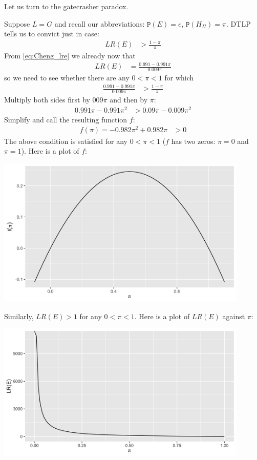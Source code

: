 \documentclass{ifcolog}
\newcommand{\pr}[1]{\mbox{$\mathtt{P}(#1)$}}
\begin{document}
Let us turn to the gatecrasher paradox. 


 Suppose $L=G$ and recall our abbreviations: $\pr{E}=e$, $\pr{H_\Pi}=\pi$. DTLP tells us to convict just in case:
 \begin{align*}
 LR(E) &> \frac{1-\pi}{\pi}
 \end{align*}
 \noindent From \eqref{eq:Cheng_lre} we already now that 
 \begin{align*}
 LR(E) & = \frac{0.991-0.991\pi}{0.009\pi}
 \end{align*}
 \noindent so we need to see whether there are any $0<\pi<1$ for which  
 \begin{align*}
  \frac{0.991-0.991\pi}{0.009\pi} &> \frac{1-\pi}{\pi}
 \end{align*}
 \noindent Multiply both sides first by $009\pi$ and then by $\pi$:
 \begin{align*}
 0.991\pi - 0.991\pi^2 &> 0.09\pi - 0.009\pi^2
 \end{align*}
 \noindent Simplify and call the resulting function $f$:
 \begin{align*}
 f(\pi) = - 0.982 \pi^2 + 0.982\pi &>0 
 \end{align*}
 \noindent The above condition is satisfied for any $0<\pi <1$ ($f$ has two zeros: $\pi = 0$ and $\pi = 1$). Here is  a plot of $f$:

 \includegraphics[width=12cm]{f-gate.png}

 Similarly, $LR(E)>1$ for any $0< \pi <1$. Here is a plot of $LR(E)$ against $\pi$:

 \includegraphics[width=12cm]{lre-gate.png}
\end{document}
